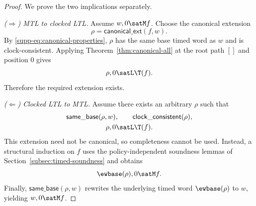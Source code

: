 \begin{proof}
We prove the two implications separately.

\smallskip
\noindent\emph{($\Rightarrow$) MTL to clocked LTL.}
Assume $w,0\satM f$.  Choose the canonical extension
\[
  \rho=\mathsf{canonical\_ext}(f,w).
\]
By \eqref{supp-eq:canonical-properties}, $\rho$ has the same base timed word as $w$ and is
clock-consistent.  Applying Theorem~\ref{thm:canonical-all} at the root path $[]$ and
position $0$ gives
\[
  \rho,0\satL\T(f).
\]
Therefore the required extension exists.

\smallskip
\noindent\emph{($\Leftarrow$) Clocked LTL to MTL.}
Assume there exists an arbitrary $\rho$ such that
\[
\begin{gathered}
  \mathsf{same\_base}(\rho,w),\qquad
  \mathsf{clock\_consistent}(\rho),\\
  \rho,0\satL\T(f).
\end{gathered}
\]
This extension need not be canonical, so completeness cannot be used.  Instead, a
structural induction on $f$ uses the policy-independent soundness lemmas of
Section~\ref{subsec:timed-soundness} and obtains
\[
  \ewbase(\rho),0\satM f.
\]
Finally, $\mathsf{same\_base}(\rho,w)$ rewrites the underlying timed word
$\ewbase(\rho)$ to $w$, yielding $w,0\satM f$.
\end{proof}
